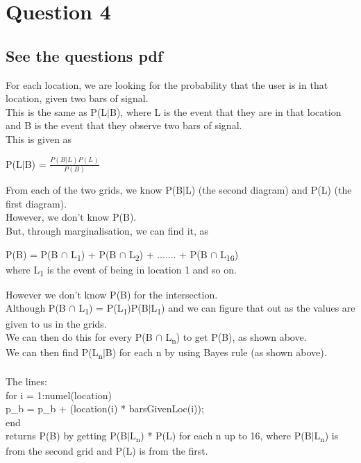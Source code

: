\documentclass{report}
\begin{document}
		
		
		
		
		
		
		\section*{\hfil Question 4 \hfil}
		\subsection*{See the questions pdf}
		For each location, we are looking for the probability that the user is in that location, given two bars of signal.\\
		This is the same as P(L$\vert$B), where L is the event that they are in that location and B is the event that they observe two bars of signal.\\
		This is given as 
		\begin{center}
			P(L$\vert$B) = $\frac{P(B \vert L)P(L)}{P(B)}$
		\end{center}
		From each of the two grids, we know P(B$\vert$L) (the second diagram) and P(L) (the first diagram).\\
		However, we don't know P(B).\\
		But, through marginalisation, we can find it, as 
		\begin{center}
			P(B) = P(B $\cap$ L\textsubscript{1}) + P(B $\cap$ L\textsubscript{2}) + ....... + P(B $\cap$ L\textsubscript{16})\\
			where L\textsubscript{1} is the event of being in location 1 and so on.
		\end{center}
		However we don't know P(B) for the intersection.\\
		Although P(B $\cap$ L\textsubscript{1}) = P(L\textsubscript{1})P(B$\vert$L\textsubscript{1}) and we can figure that out as the values are given to us in the grids.\\
		We can then do this for every P(B $\cap$ L\textsubscript{n}) to get P(B), as shown above.\\
		We can then find P(L\textsubscript{n}$\vert$B) for each n by using Bayes rule (as shown above).\\\\
		The lines:\\
		\indent	for i = 1:numel(location)\\
		\indent \indent p\_b = p\_b + (location(i) * barsGivenLoc(i));\\
		\indent end\\
		returns P(B) by getting P(B$\vert$L\textsubscript{n}) * P(L) for each n up to 16, where P(B$\vert$L\textsubscript{n}) is from the second grid and P(L) is from the first.\\\\
\end{document}
